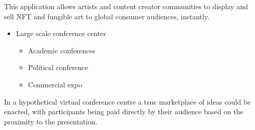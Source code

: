 This application allows artists and content creator communities to
display and sell NFT and fungible art to global consumer audiences,
instantly.

\begin{itemize}
\item
  Large scale conference center

  \begin{itemize}
  \item
    Academic conferences
  \item
    Political conference
  \item
    Commercial expo
  \end{itemize}
\end{itemize}

In a hypothetical virtual conference centre a true marketplace of ideas
could be enacted, with participants being paid directly by their
audience based on the proximity to the presentation.

